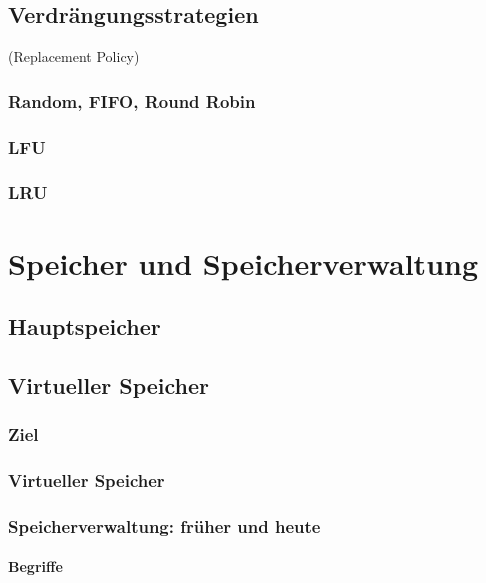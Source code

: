 \section{Verdrängungsstrategien}
(Replacement Policy)
\subsection{Random, FIFO, Round Robin}
\subsection{LFU}
\subsection{LRU}

\chapter{Speicher und Speicherverwaltung}
\section*{Hauptspeicher}
\section{Virtueller Speicher}
\subsection{Ziel}
\subsection{Virtueller Speicher}
\subsection{Speicherverwaltung: früher und heute}
\subsubsection{Begriffe}


